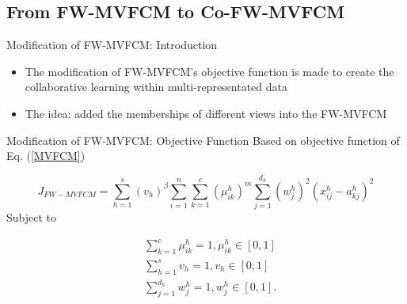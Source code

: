 \documentclass[compress,sky blue]{beamer}
\begin{document}

\subsection{From FW-MVFCM to Co-FW-MVFCM}


\begin{frame}{Modification of FW-MVFCM: Introduction}
	\vspace{-0.3cm}	
   
   \begin{itemize}
   \item    The modification of FW-MVFCM's objective function is made to create the collaborative learning  within multi-representated data 
\item The idea: added the memberships of different views into the FW-MVFCM
   \end{itemize}
        

\end{frame}


\begin{frame}{Modification of FW-MVFCM: Objective Function}
	\vspace{-0.3cm}	
\scriptsize{Based on objective function of Eq. (\ref{MVFCM})}

	\begin{equation}
            J_{FW-MVFCM}  = \sum_{h=1}^{s} (v_{h})^{\beta}\sum_{i=1}^{n}\sum_{k=1}^{c} \left(\mu_{ik}^{h}\right)^{m} \sum_{j=1}^{d_{h}} (w_j^{h})^2 \left(x_{ij}^{h}-a_{kj}^{h}\right)^2
            \label{FW-MVFCM1} %
        \end{equation}Subject to
        
\begin{equation}
\begin{aligned}
{} & \sum_{k=1}^{c}\mu_{ik}^{h}=1, \mu_{ik}^{h}\in[0,1] \\
      & \sum_{h=1}^{s}v_{h}=1, v_{h}\in[0,1]\\
      & \sum_{j=1}^{d_h} w_j^{h}= 1, w_j^{h}\in[0,1].
\end{aligned}
\label{constraint}
\end{equation}
        


\end{frame}
\end{document}

